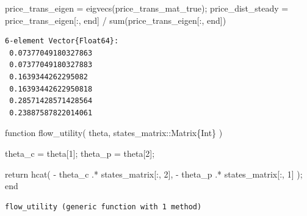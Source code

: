 \documentclass[
  letterpaper,
  DIV=11,
  numbers=noendperiod]{scrreprt}
\newenvironment{Shaded}{\begin{snugshade}}{\end{snugshade}}
\newcommand{\ControlFlowTok}[1]{\textcolor[rgb]{0.00,0.23,0.31}{#1}}
\newcommand{\DataTypeTok}[1]{\textcolor[rgb]{0.68,0.00,0.00}{#1}}
\newcommand{\FloatTok}[1]{\textcolor[rgb]{0.68,0.00,0.00}{#1}}
\newcommand{\FunctionTok}[1]{\textcolor[rgb]{0.28,0.35,0.67}{#1}}
\newcommand{\KeywordTok}[1]{\textcolor[rgb]{0.00,0.23,0.31}{#1}}
\newcommand{\NormalTok}[1]{\textcolor[rgb]{0.00,0.23,0.31}{#1}}
\newcommand{\OperatorTok}[1]{\textcolor[rgb]{0.37,0.37,0.37}{#1}}
\begin{document}
\begin{Shaded}
\begin{Highlighting}[]
\NormalTok{price\_trans\_eigen }\OperatorTok{=} \FunctionTok{eigvecs}\NormalTok{(price\_trans\_mat\_true}\OperatorTok{\textquotesingle{}}\NormalTok{);}
\NormalTok{price\_dist\_steady }\OperatorTok{=}\NormalTok{ price\_trans\_eigen[}\OperatorTok{:}\NormalTok{, }\KeywordTok{end}\NormalTok{] }\OperatorTok{/} \FunctionTok{sum}\NormalTok{(price\_trans\_eigen[}\OperatorTok{:}\NormalTok{, }\KeywordTok{end}\NormalTok{])}
\end{Highlighting}
\end{Shaded}

\begin{verbatim}
6-element Vector{Float64}:
 0.07377049180327863
 0.07377049180327883
 0.1639344262295082
 0.16393442622950818
 0.28571428571428564
 0.23887587822014061
\end{verbatim}

\begin{Shaded}
\begin{Highlighting}[]
\KeywordTok{function} \FunctionTok{flow\_utility}\NormalTok{(}
\NormalTok{    theta,}
\NormalTok{    states\_matrix}\OperatorTok{::}\DataTypeTok{Matrix\{Int\}}
\NormalTok{    )}

\NormalTok{    theta\_c }\OperatorTok{=}\NormalTok{ theta[}\FloatTok{1}\NormalTok{];}
\NormalTok{    theta\_p }\OperatorTok{=}\NormalTok{ theta[}\FloatTok{2}\NormalTok{];}

    \ControlFlowTok{return} \FunctionTok{hcat}\NormalTok{(}
        \OperatorTok{{-}}\NormalTok{ theta\_c }\OperatorTok{.*}\NormalTok{ states\_matrix[}\OperatorTok{:}\NormalTok{, }\FloatTok{2}\NormalTok{],}
        \OperatorTok{{-}}\NormalTok{ theta\_p }\OperatorTok{.*}\NormalTok{ states\_matrix[}\OperatorTok{:}\NormalTok{, }\FloatTok{1}\NormalTok{]}
\NormalTok{    );}
\KeywordTok{end}
\end{Highlighting}
\end{Shaded}

\begin{verbatim}
flow_utility (generic function with 1 method)
\end{verbatim}
\end{document}
